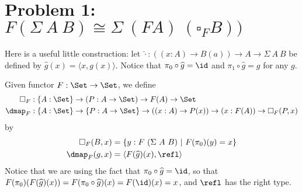 \documentclass{article}
\begin{document}
\section*{Problem 1: $F (\Sigma\ A\ B) \cong \Sigma\ (F A)\ (\square_F B))$}

Here is a useful little construction: let $\widehat{\cdot} : ((x : A) \to B(a)) \to A \to \Sigma\ A\ B$ be defined by $\widehat{g}(x) = \langle x , g(x)\rangle$. Notice that $\pi_0 \circ \widehat{g} = \id$ and $\pi_1 \circ \widehat{g} = g$ for any $g$.

\begin{definition}
  Given functor $F : \Set \to \Set$, we define
\begin{align*}
\square_F &: \{A : \Set\} \to (P : A \to \Set) \to F(A) \to \Set \\
\dmap_F &: \{A : \Set\} \to \{P : A \to \Set\} \to ((x : A) \to  P(x)) \to (x : F(A)) \to \square_F(P, x)
\end{align*}
  by
\begin{align*}
  \square_F(B, x) &= \{ y : F\ (\Sigma\ A\ B )\ |\ F(\pi_0)(y) = x\} \\
  \dmap_F(g, x) &= \langle F(\widehat{g})(x), \refl\rangle
\end{align*}
Notice that we are using the fact that $\pi_0 \circ \widehat{g} = \id$, so that $F(\pi_0)(F(\widehat{g})(x)) = F(\pi_0 \circ \widehat{g})(x) = F(\id)(x) = x$, and $\refl$ has the right type.
\end{definition}
\end{document}
